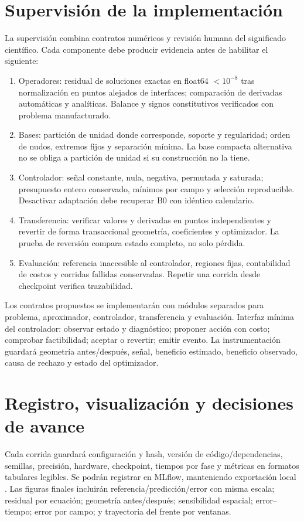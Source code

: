 \section{Supervisión de la implementación}
La supervisión combina contratos numéricos y revisión humana del significado científico. Cada componente debe producir evidencia antes de habilitar el siguiente:
\begin{enumerate}
\item Operadores: residual de soluciones exactas en float64 $<10^{-8}$ tras normalización en puntos alejados de interfaces; comparación de derivadas automáticas y analíticas. Balance y signos constitutivos verificados con problema manufacturado.
\item Bases: partición de unidad donde corresponde, soporte y regularidad; orden de nudos, extremos fijos y separación mínima. La base compacta alternativa no se obliga a partición de unidad si su construcción no la tiene.
\item Controlador: señal constante, nula, negativa, permutada y saturada; presupuesto entero conservado, mínimos por campo y selección reproducible. Desactivar adaptación debe recuperar B0 con idéntico calendario.
\item Transferencia: verificar valores y derivadas en puntos independientes y revertir de forma transaccional geometría, coeficientes y optimizador. La prueba de reversión compara estado completo, no solo pérdida.
\item Evaluación: referencia inaccesible al controlador, regiones fijas, contabilidad de costos y corridas fallidas conservadas. Repetir una corrida desde checkpoint verifica trazabilidad.
\end{enumerate}
Los contratos propuestos se implementarán con módulos separados para problema, aproximador, controlador, transferencia y evaluación. Interfaz mínima del controlador: observar estado y diagnóstico; proponer acción con costo; comprobar factibilidad; aceptar o revertir; emitir evento. La instrumentación guardará geometría antes/después, señal, beneficio estimado, beneficio observado, causa de rechazo y estado del optimizador.

\section{Registro, visualización y decisiones de avance}
Cada corrida guardará configuración y hash, versión de código/dependencias, semillas, precisión, hardware, checkpoint, tiempos por fase y métricas en formatos tabulares legibles. Se podrán registrar en MLflow, manteniendo exportación local \cite{zaharia2018mlflow}. Las figuras finales incluirán referencia/predicción/error con misma escala; residual por ecuación; geometría antes/después; sensibilidad espacial; error--tiempo; error por campo; y trayectoria del frente por ventanas.

